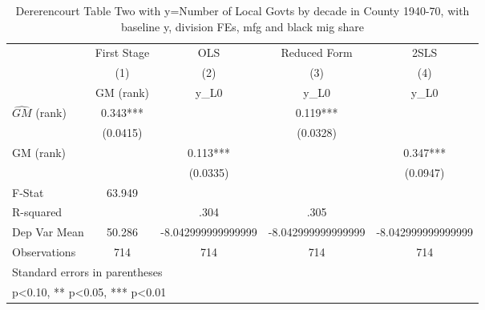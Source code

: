 \begin{table}[htbp]\centering
\def\sym#1{\ifmmode^{#1}\else\(^{#1}\)\fi}
\caption{Dererencourt Table Two with y=Number of Local Govts by decade in County 1940-70, with baseline y, division FEs, mfg and black mig share}
\begin{tabular}{l*{4}{c}}
\toprule
                    & First Stage   &         OLS   &Reduced Form   &        2SLS   \\
                    &\multicolumn{1}{c}{(1)}&\multicolumn{1}{c}{(2)}&\multicolumn{1}{c}{(3)}&\multicolumn{1}{c}{(4)}\\
                    &\multicolumn{1}{c}{GM  (rank)}&\multicolumn{1}{c}{y\_L0}&\multicolumn{1}{c}{y\_L0}&\multicolumn{1}{c}{y\_L0}\\
\midrule
$\hat{GM}$ (rank)   &       0.343***&               &       0.119***&               \\
                    &    (0.0415)   &               &    (0.0328)   &               \\
\addlinespace
GM  (rank)          &               &       0.113***&               &       0.347***\\
                    &               &    (0.0335)   &               &    (0.0947)   \\
\midrule
F-Stat              &      63.949   &               &               &               \\
R-squared           &               &        .304   &        .305   &               \\
Dep Var Mean        &      50.286   &-8.042999999999999   &-8.042999999999999   &-8.042999999999999   \\
Observations        &         714   &         714   &         714   &         714   \\
\bottomrule
\multicolumn{5}{l}{\footnotesize Standard errors in parentheses}\\
\multicolumn{5}{l}{\footnotesize * p<0.10, ** p<0.05, *** p<0.01}\\
\end{tabular}
\end{table}
